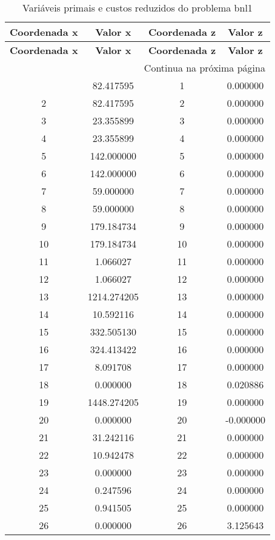 \documentclass[12pt]{article}
\begin{document}
\begin{longtable}{@{}cccc@{}}
\caption{Variáveis primais e custos reduzidos do problema bnl1} \\
\toprule
\textbf{Coordenada x} & \textbf{Valor x} & \textbf{Coordenada z} & \textbf{Valor z} \\
\midrule
\endfirsthead

\toprule
\textbf{Coordenada x} & \textbf{Valor x} & \textbf{Coordenada z} & \textbf{Valor z} \\
\midrule
\endhead

\midrule \multicolumn{4}{r}{{Continua na próxima página}} \\ \midrule
\endfoot

\bottomrule
\endlastfoot
1 & 82.417595 & 1 & 0.000000 \\
2 & 82.417595 & 2 & 0.000000 \\
3 & 23.355899 & 3 & 0.000000 \\
4 & 23.355899 & 4 & 0.000000 \\
5 & 142.000000 & 5 & 0.000000 \\
6 & 142.000000 & 6 & 0.000000 \\
7 & 59.000000 & 7 & 0.000000 \\
8 & 59.000000 & 8 & 0.000000 \\
9 & 179.184734 & 9 & 0.000000 \\
10 & 179.184734 & 10 & 0.000000 \\
11 & 1.066027 & 11 & 0.000000 \\
12 & 1.066027 & 12 & 0.000000 \\
13 & 1214.274205 & 13 & 0.000000 \\
14 & 10.592116 & 14 & 0.000000 \\
15 & 332.505130 & 15 & 0.000000 \\
16 & 324.413422 & 16 & 0.000000 \\
17 & 8.091708 & 17 & 0.000000 \\
18 & 0.000000 & 18 & 0.020886 \\
19 & 1448.274205 & 19 & 0.000000 \\
20 & 0.000000 & 20 & -0.000000 \\
21 & 31.242116 & 21 & 0.000000 \\
22 & 10.942478 & 22 & 0.000000 \\
23 & 0.000000 & 23 & 0.000000 \\
24 & 0.247596 & 24 & 0.000000 \\
25 & 0.941505 & 25 & 0.000000 \\
26 & 0.000000 & 26 & 3.125643 \\

\end{longtable}
\end{document}
